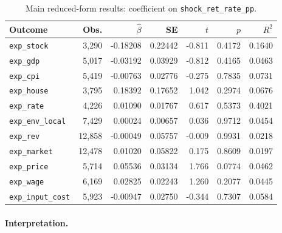 \documentclass[11pt,letterpaper,english,final]{article}
\begin{document}
\begin{table}[H]
\centering
\small
\setlength{\tabcolsep}{5pt}
\caption{Main reduced-form results: coefficient on \texttt{shock\_ret\_rate\_pp}.}
\label{tab:rf_main_results_20260901}
\begin{tabular}{lrrrrrr}
\toprule
Outcome & Obs. & $\hat\beta$ & SE & $t$ & $p$ & $R^2$ \\
\midrule
\texttt{exp\_stock}      & 3{,}290  & -0.18208 & 0.22442 & -0.811 & 0.4172 & 0.1640 \\
\texttt{exp\_gdp}        & 5{,}017  & -0.03192 & 0.03929 & -0.812 & 0.4165 & 0.0463 \\
\texttt{exp\_cpi}        & 5{,}419  & -0.00763 & 0.02776 & -0.275 & 0.7835 & 0.0731 \\
\texttt{exp\_house}      & 3{,}795  & 0.18392  & 0.17652 & 1.042  & 0.2974 & 0.0676 \\
\texttt{exp\_rate}       & 4{,}226  & 0.01090  & 0.01767 & 0.617  & 0.5373 & 0.4021 \\
\texttt{exp\_env\_local} & 7{,}429  & 0.00024  & 0.00657 & 0.036  & 0.9712 & 0.0454 \\
\texttt{exp\_rev}        & 12{,}858 & -0.00049 & 0.05757 & -0.009 & 0.9931 & 0.0218 \\
\texttt{exp\_market}     & 12{,}478 & 0.01020  & 0.05822 & 0.175  & 0.8609 & 0.0197 \\
\texttt{exp\_price}      & 5{,}714  & 0.05536  & 0.03134 & 1.766  & 0.0774 & 0.0462 \\
\texttt{exp\_wage}       & 6{,}169  & 0.02825  & 0.02243 & 1.260  & 0.2077 & 0.0445 \\
\texttt{exp\_input\_cost}& 5{,}923  & -0.00947 & 0.02750 & -0.344 & 0.7307 & 0.0584 \\
\bottomrule
\end{tabular}
\end{table}

\paragraph{Interpretation.}
\end{document}
